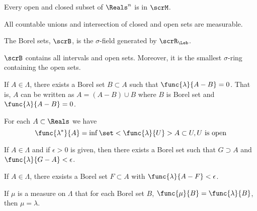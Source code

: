 \begin{proposition}
    Every open and closed subset of \(\Reals^n\) is in \(\scrM\).
\end{proposition}

\begin{corollary}
    All countable unions and intersection of closed and open sets are measurable.
\end{corollary}

\begin{definition}
    The Borel sets, \(\scrB\), is the \(\sigma\)-field generated by \(\scrR_{\Leb}\).
\end{definition}

\begin{proposition}
    \(\scrB\) contains all intervals and open sets. Moreover, it is the smallest \(\sigma\)-ring containing the open sets.
\end{proposition}

\begin{theorem}
    If \(A \in \Lambda\), there exists a Borel set \(B \subset A\) such that \(\func{\lambda}{A - B} =0\). That is, \(A\) can be written as \(A = (A - B) \cup B\) where \(B\) is Borel set and \(\func{\lambda}{A - B} = 0\).
\end{theorem}

\begin{theorem}
    For each \(A \subset \Reals\) we have 
    \begin{equation*}
        \func{\lambda^{\ast}}{A} = \inf \set<\func{\lambda}{U}>{A \subset U, U \text{ is open}}
    \end{equation*}
\end{theorem}

\begin{corollary}
    If \(A \in \Lambda\) and if \(\epsilon > 0\) is given, then there exists a Borel set such that \(G \supset A\) and \(\func{\lambda}{G - A} < \epsilon\).
\end{corollary}

\begin{corollary}
    If \(A \in \Lambda\), there exsists a Borel set \(F \subset A\) with \(\func{\lambda}{A - F} < \epsilon\).
\end{corollary}

\begin{corollary}
    If \(\mu\) is a measure on \(\Lambda\) that for each Borel set \(B\), \(\func{\mu}{B} = \func{\lambda}{B}\), then \(\mu = \lambda\).
\end{corollary}

